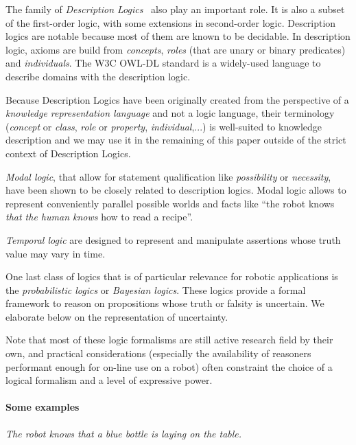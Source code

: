 \documentclass[a4paper, twocolumn]{article}
\begin{document}
The family of \emph{Description Logics}~\cite{Baader2008} also play an
important role. It is also a subset of the first-order logic, with some
extensions in second-order logic. Description logics are notable because most
of them are known to be decidable. In description logic, axioms are build from
\emph{concepts}, \emph{roles} (that are unary or binary predicates) and
\emph{individuals}. The W3C OWL-DL standard is a widely-used language to
describe domains with the description logic.

Because Description Logics have been originally created from the perspective of
a \emph{knowledge representation language} and not a logic language, their
terminology (\emph{concept} or \emph{class}, \emph{role} or \emph{property},
\emph{individual},...) is well-suited to knowledge description and we may use
it in the remaining of this paper outside of the strict context of  Description
Logics.

\emph{Modal logic}, that allow for statement qualification like
\emph{possibility} or \emph{necessity}, have been shown to be closely related
to description logics. Modal logic allows to represent conveniently parallel
possible worlds and facts like ``the robot knows \emph{that the human knows}
how to read a recipe''.


\emph{Temporal logic} are designed to represent and manipulate assertions whose
truth value may vary in time.

One last class of logics that is of particular relevance for robotic
applications is the \emph{probabilistic logics} or \emph{Bayesian logics}.
These logics provide a formal framework to reason on propositions whose truth
or falsity is uncertain. We elaborate below on the representation of uncertainty.

Note that most of these logic formalisms are still active research field by
their own, and practical considerations (especially the availability of
reasoners performant enough for on-line use on a robot) often constraint the
choice of a logical formalism and a level of expressive power.


\paragraph{Some examples}

\emph{The robot knows that a blue bottle is laying on the table.}
\end{document}
